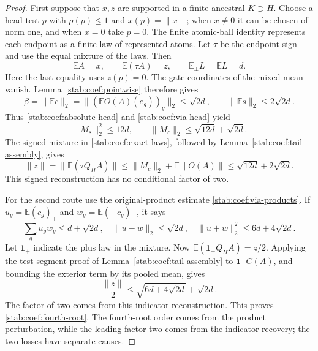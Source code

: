 \begin{proof}
First suppose that $x,z$ are supported in a finite ancestral
$K\supset H$. Choose a head test $p$ with $\rho(p)\le1$ and
$x(p)=\|x\|$; when $x\ne0$ it can be chosen of norm one, and
when $x=0$ take $p=0$. The finite atomic-ball identity represents
each endpoint as a finite law of represented atoms. Let $\tau$ be
the endpoint sign and use the equal mixture of the laws. Then
\begin{equation}\label{stab:coef:exact-laws}
 \mathbb EA=x,\qquad \mathbb E(\tau A)=z,\qquad
 \mathbb E_\pm L=\mathbb E L=d.
\end{equation}
Here the last equality uses $z(p)=0$. The gate coordinates of the
mixed mean vanish. Lemma~\ref{stab:coef:pointwise} therefore gives
\begin{equation}\label{stab:coef:exact-means}
 \beta=\|\mathbb E c\|_2
 =\|(\mathbb E O(A)(e_g))_g\|_2\le\sqrt{2d},
 \qquad \|\mathbb E s\|_2\le2\sqrt{2d}.
\end{equation}
Thus \eqref{stab:coef:absolute-head} and
\eqref{stab:coef:via-head} yield
\begin{equation}\label{stab:coef:twelve}
 \|M_s\|_2^2\le12d,\qquad
 \|M_c\|_2\le\sqrt{12d}+\sqrt{2d}.
\end{equation}
The signed mixture in \eqref{stab:coef:exact-laws}, followed by
Lemma~\ref{stab:coef:tail-assembly}, gives
\[
 \|z\|=\|\mathbb E(\tau Q_HA)\|
 \le\|M_c\|_2+\mathbb E\|O(A)\|
 \le\sqrt{12d}+2\sqrt{2d}.
\]
This signed reconstruction has no conditional factor of two.

For the second route use the original-product estimate
\eqref{stab:coef:via-products}. If
$u_g=\mathbb E(c_g)_+$ and $w_g=\mathbb E(-c_g)_+$, it says
\begin{equation}\label{stab:coef:fourth-moments}
 \sum_g u_gw_g\le d+\sqrt{2d},\quad
 \|u-w\|_2\le\sqrt{2d},\quad
 \|u+w\|_2^2\le6d+4\sqrt{2d}.
\end{equation}
Let $\mathbf1_+$ indicate the plus law in the mixture. Now
$\mathbb E(\mathbf1_+Q_HA)=z/2$. Applying the test-segment proof
of Lemma~\ref{stab:coef:tail-assembly} to
$\mathbf1_+C(A)$, and bounding the exterior term by its pooled
mean, gives
\[
 \frac{\|z\|}{2}
 \le\sqrt{6d+4\sqrt{2d}}+\sqrt{2d}.
\]
The factor of two comes from this indicator reconstruction. This
proves \eqref{stab:coef:fourth-root}. The fourth-root order comes from
the product perturbation, while the leading factor two comes from the
indicator recovery; the two losses have separate causes.


\end{proof}
